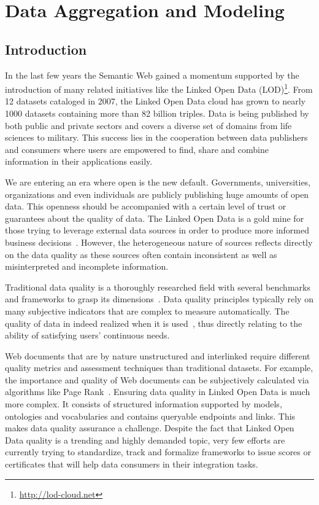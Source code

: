 \chapter{Data Aggregation and Modeling}\label{chapter:data-quality}
\graphicspath{{Part1/Chapter3/figures/}}

\section{Introduction}
In the last few years the Semantic Web gained a momentum supported by the introduction of many related initiatives like the Linked Open Data (LOD)\footnote{\url{http://lod-cloud.net}}. From 12 datasets cataloged in 2007, the Linked Open Data cloud has grown to nearly 1000 datasets containing more than 82 billion triples. Data is being published by both public and private sectors and covers a diverse set of domains from life sciences to military. This success lies in the cooperation between data publishers and consumers where users are empowered to find, share and combine information in their applications easily.

We are entering an era where open is the new default. Governments, universities, organizations and even individuals are publicly publishing huge amounts of open data. This openness should be accompanied with a certain level of trust or guarantees about the quality of data. The Linked Open Data is a gold mine for those trying to leverage external data sources in order to produce more informed business decisions~\cite{Boyd:Article:11}. However, the heterogeneous nature of sources reflects directly on the data quality as these sources often contain inconsistent as well as misinterpreted and incomplete information.

Traditional data quality is a thoroughly researched field with several benchmarks and frameworks to grasp its dimensions~\cite{Kahn:ACM:02,Stvilia:ASIST:07,Wang:MIS:96}. Data quality principles typically rely on many subjective indicators that are complex to measure automatically. The quality of data in indeed realized when it is used~\cite{Juran:McGraw:99}, thus directly relating to the ability of satisfying users' continuous needs.

Web documents that are by nature unstructured and interlinked require different quality metrics and assessment techniques than traditional datasets. For example, the importance and quality of Web documents can be subjectively calculated via algorithms like Page Rank~\cite{ Page:TechReport:98}. Ensuring data quality in Linked Open Data is much more complex. It consists of structured information supported by models, ontologies and vocabularies and contains queryable endpoints and links. This makes data quality assurance a challenge. Despite the fact that Linked Open Data quality is a trending and highly demanded topic, very few efforts are currently trying to standardize, track and formalize frameworks to issue scores or certificates that will help data consumers in their integration tasks.

